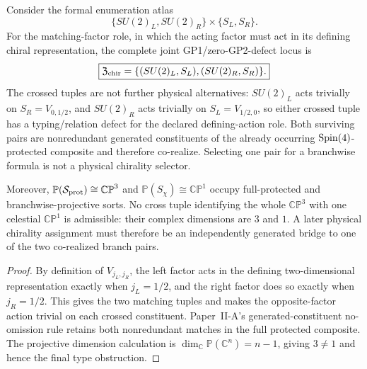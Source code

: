 \documentclass[12pt,a4paper]{article}
\begin{document}
\begin{theorem}
\label{p2e:thm:joint-chiral-typing-locus}
Consider the formal enumeration atlas
\[
 \{SU(2)_L,SU(2)_R\}\times\{S_L,S_R\}.
\]
For the matching-factor role, in which the acting factor must act in its
defining chiral representation, the complete joint
GP1/zero-GP2-defect locus is
\[
 \boxed{
 \mathfrak Z_{\rm chir}
 =\{(SU(2)_L,S_L),(SU(2)_R,S_R)\}.}
\]
The crossed tuples are not further physical alternatives: \(SU(2)_L\) acts
trivially on \(S_R=V_{0,1/2}\), and \(SU(2)_R\) acts trivially on
\(S_L=V_{1/2,0}\), so either crossed tuple has a typing/relation defect for the
declared defining-action role.  Both surviving pairs are nonredundant generated
constituents of the already occurring
\(\mathrm{Spin}(4)\)-protected composite and therefore co-realize.  Selecting one pair
for a branchwise formula is not a physical chirality selector.

Moreover, \(\mathbb P(\mathcal S_{\rm prot})\cong\mathbb{CP}^3\) and
\(\mathbb P(S_\chi)\cong\mathbb{CP}^1\) occupy full-protected and
branchwise-projective sorts.  No cross tuple identifying the whole
\(\mathbb{CP}^3\) with one celestial \(\mathbb{CP}^1\) is admissible: their
complex dimensions are \(3\) and \(1\).  A later physical chirality assignment
must therefore be an independently generated bridge to one of the two
co-realized branch pairs.
\end{theorem}

\begin{proof}
By definition of \(V_{j_L,j_R}\), the left factor acts in the defining
two-dimensional representation exactly when \(j_L=1/2\), and the right factor
does so exactly when \(j_R=1/2\).  This gives the two matching tuples and makes
the opposite-factor action trivial on each crossed constituent.  Paper~II-A's
generated-constituent no-omission rule retains both nonredundant matches in the
full protected composite.  The projective dimension calculation is
\(\dim_{\mathbb C}\mathbb P(\mathbb C^n)=n-1\), giving \(3\neq1\) and hence
the final type obstruction.
\end{proof}
\end{document}
